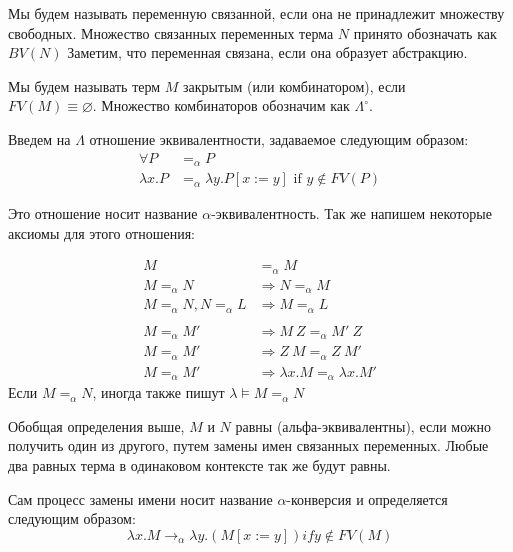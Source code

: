 \documentclass[lambda.tex]{subfiles}
\begin{document}
Мы будем называть переменную связанной, если она не принадлежит множеству свободных. Множество связанных переменных терма $N$ принято обозначать как $BV(N)$ Заметим, что переменная связана, если она образует абстракцию.

Мы будем называть терм $M$ закрытым (или комбинатором), если\\ \(FV(M) \equiv \varnothing\). Множество комбинаторов обозначим как $\Lambda^\circ$.

\begin{tcolorbox}
Введем на $\Lambda$ отношение эквивалентности, задаваемое следующим образом:
\begin{align*}
\forall P &=_\alpha P\\
\lambda x.P &=_\alpha \lambda y.P[x:=y] \text{ if } y \not\in FV(P)
\end{align*}

Это отношение носит название $\alpha$-эквивалентность. Так же напишем некоторые аксиомы для этого отношения:

\begin{align*}
M &=_\alpha M\\
M =_\alpha N &\Rightarrow N =_\alpha M\\
M =_\alpha N, N =_\alpha L &\Rightarrow M =_\alpha L\\
\\
M =_\alpha M' &\Rightarrow M\ Z =_\alpha M'\ Z\\
M =_\alpha M' &\Rightarrow Z\ M =_\alpha Z\ M'\\
M =_\alpha M' &\Rightarrow \lambda x.M =_\alpha \lambda x.M'
\end{align*}
Если $M =_\alpha N$, иногда также пишут $\lambda\models M =_\alpha N$


Обобщая определения выше, $M$ и $N$ равны (альфа-эквивалентны), если можно получить один из другого, путем замены имен связанных переменных. Любые два равных терма в одинаковом контексте так же будут равны.

Сам процесс замены имени носит название $\alpha$-конверсия и определяется следующим образом:
\begin{equation*}
\lambda x.M \rightarrow_\alpha \lambda y.(M[x := y]) if y \not\in FV(M)\tag{$\alpha$}
\end{equation*}



\end{tcolorbox}
\end{document}
